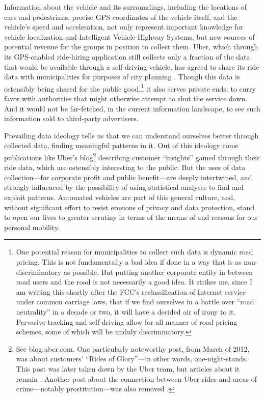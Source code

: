 Information about the vehicle
and its surroundings, including the locations of cars and pedestrians,
precise GPS coordinates of the vehicle itself, and the vehicle's speed
and acceleration, not only represent important knowledge for
vehicle localization and Intelligent Vehicle-Highway Systems, but new sources of potential
revenue for the groups in position to collect them. Uber, which
through its GPS-enabled ride-hiring application still collects only a
fraction of the data that would be available through a self-driving
vehicle, has agreed to share its ride data with municipalities for purposes of
city planning \cite{uberJardin}. Though this data is ostensibly being
shared for the public good,\footnote{One potential reason for municipalities to
  collect such data is dynamic road pricing. This is not fundamentally
a bad idea if done in a way that is as non-discriminatory as possible,
But putting another
corporate entity in between road users and the road is not necessarily
a good idea. It strikes me, since I am writing this shortly after the
FCC's reclassification of Internet service under common carriage laws,
that if we find ourselves in a battle over ``road neutrality'' in a
decade or two, it will have a decided air of irony to it. Pervasive
tracking and self-driving allow for all manner of road pricing
schemes, some of which will be unduly discriminatory.} it also serves private ends:  to curry favor with
authorities that might otherwise attempt to shut the service down. And it would
not be far-fetched, in the current 
information landscape, to see such information sold to third-party advertisers.

Prevailing data ideology tells us that we can understand ourselves better through
collected data, finding meaningful patterns in it. Out of this
ideology come publications like Uber's 
blog\footnote{See blog.uber.com. One particularly noteworthy post,
  from March of 2012, was about customers' ``Rides of Glory''---in
  other words, one-night-stands. This post was later taken down by the
Uber team, but articles about it remain \cite{gigaomHarris}. Another
post about the connection between Uber rides and areas of
crime---notably prostitution---was also removed \cite{venturebeatObrien}.} 
describing customer ``insights'' gained through their ride data, which
are ostensibly interesting to the public. But the uses of data collection---for corporate
profit and public benefit---are deeply intertwined, and strongly
influenced by the possibility of using
statistical analyses to find and exploit patterns. Automated vehicles
are part of this general culture, and, without significant effort to
resist erosions of privacy and data protection, stand to open our lives
to greater scrutiny in terms of the means of and reasons for our
personal mobility.

